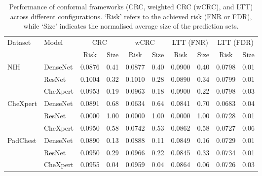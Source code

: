 \begin{table}
    \centering
    \begin{tabular}{llrrrrrrrr}
        \toprule
        \multirow{2}{*}[-0.2em]{Dataset} & \multirow{2}{*}[-0.2em]{Model} &
        \multicolumn{2}{c}{CRC} & \multicolumn{2}{c}{wCRC} &
        \multicolumn{2}{c}{LTT (FNR)} & \multicolumn{2}{c}{LTT (FDR)} \\

        \cmidrule(lr){3-4} \cmidrule(lr){5-6} \cmidrule(lr){7-8} \cmidrule(lr){9-10}

        & & \multicolumn{1}{c}{Risk} & \multicolumn{1}{c}{Size}
        & \multicolumn{1}{c}{Risk} & \multicolumn{1}{c}{Size}
        & \multicolumn{1}{c}{Risk} & \multicolumn{1}{c}{Size}
        & \multicolumn{1}{c}{Risk} & \multicolumn{1}{c}{Size} \\
        \midrule
        NIH      & DenseNet & 0.0876 & 0.41 & 0.0877 & 0.40 & 0.0900 & 0.40 & 0.0798 & 0.01 \\
                 & ResNet   & 0.1004 & 0.32 & 0.1010 & 0.28 & 0.0890 & 0.34 & 0.0799 & 0.01 \\
                 & CheXpert & 0.0953 & 0.19 & 0.0963 & 0.18 & 0.0900 & 0.22 & 0.0798 & 0.03 \\
        \addlinespace
        CheXpert & DenseNet & 0.0891 & 0.68 & 0.0634 & 0.64 & 0.0841 & 0.70 & 0.0683 & 0.04 \\
                 & ResNet   & 0.0000 & 1.00 & 0.0000 & 1.00 & 0.0000 & 1.00 & 0.0728 & 0.01 \\
                 & CheXpert & 0.0950 & 0.58 & 0.0742 & 0.53 & 0.0862 & 0.58 & 0.0727 & 0.06 \\
        \addlinespace
        PadChest & DenseNet & 0.0890 & 0.13 & 0.0888 & 0.11 & 0.0849 & 0.16 & 0.0729 & 0.01 \\
                 & ResNet   & 0.0950 & 0.29 & 0.0966 & 0.22 & 0.0845 & 0.33 & 0.0734 & 0.01 \\
                 & CheXpert & 0.0955 & 0.04 & 0.0959 & 0.04 & 0.0864 & 0.06 & 0.0726 & 0.03 \\
        \bottomrule
    \end{tabular}
    \caption{%
        Performance of conformal frameworks (CRC, weighted CRC (wCRC), and LTT)
        across different configurations. `Risk' refers to the achieved risk (FNR or FDR),
        while `Size' indicates the normalised average size of the prediction sets.
    }
    \label{tab:conformal-comparison}
\end{table}

